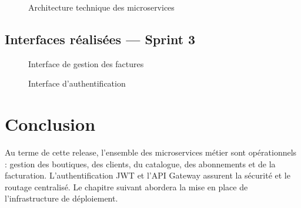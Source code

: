 \begin{figure}[H]
    \centering
    \caption{Architecture technique des microservices}
    \label{fig:architecture}
\end{figure}

\subsection{Interfaces réalisées --- Sprint 3}

\begin{figure}[H]
    \centering
    \caption{Interface de gestion des factures}
    \label{fig:ui_billing}
\end{figure}

\begin{figure}[H]
    \centering
    \caption{Interface d'authentification}
    \label{fig:ui_login}
\end{figure}

\section*{Conclusion}
Au terme de cette release, l'ensemble des microservices métier sont opérationnels : gestion des boutiques, des clients, du catalogue, des abonnements et de la facturation. L'authentification JWT et l'API Gateway assurent la sécurité et le routage centralisé. Le chapitre suivant abordera la mise en place de l'infrastructure de déploiement.

\newpage
